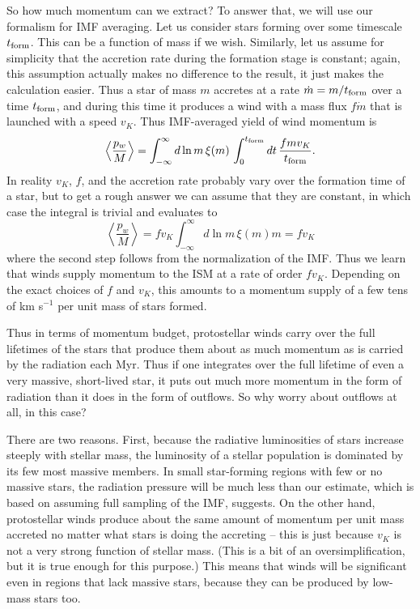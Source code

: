 So how much momentum can we extract? To answer that, we will use our formalism for IMF averaging. Let us consider stars forming over some timescale $t_{\rm form}$. This can be a function of mass if we wish. Similarly, let us assume for simplicity that the accretion rate during the formation stage is constant; again, this assumption actually makes no difference to the result, it just makes the calculation easier. Thus a star of mass $m$ accretes at a rate $\dot{m} = m/t_{\rm form}$ over a time $t_{\rm form}$, and during this time it produces a wind with a mass flux $f \dot{m}$ that is launched with a speed $v_K$. Thus IMF-averaged yield of wind momentum is
\begin{equation}
\left\langle\frac{p_w}{M}\right\rangle = \int_{-\infty}^{\infty} d\ln m \, \xi(m) \, \int_0^{t_{\rm form}} dt \, \frac{f m v_K}{t_{\rm form}}.
\end{equation}
In reality $v_K$, $f$, and the accretion rate probably vary over the formation time of a star, but to get a rough answer we can assume that they are constant, in which case the integral is trivial and evaluates to
\begin{equation}
\left\langle\frac{p_w}{M}\right\rangle =  f v_K \int_{-\infty}^{\infty} d\ln m \, \xi(m) m = f v_K
\end{equation}
where the second step follows from the normalization of the IMF. Thus we learn that winds supply momentum to the ISM at a rate of order $f v_K$. Depending on the exact choices of $f$ and $v_K$, this amounts to a momentum supply of a few tens of km s$^{-1}$ per unit mass of stars formed.

Thus in terms of momentum budget, protostellar winds carry over the full lifetimes of the stars that produce them about as much momentum as is carried by the radiation each Myr. Thus if one integrates over the full lifetime of even a very massive, short-lived star, it puts out much more momentum in the form of radiation than it does in the form of outflows. So why worry about outflows at all, in this case?

There are two reasons. First, because the radiative luminosities of stars increase steeply with stellar mass, the luminosity of a stellar population is dominated by its few most massive members. In small star-forming regions with few or no massive stars, the radiation pressure will be much less than our estimate, which is based on assuming full sampling of the IMF, suggests. On the other hand, protostellar winds produce about the same amount of momentum per unit mass accreted no matter what stars is doing the accreting -- this is just because $v_K$ is not a very strong function of stellar mass. (This is a bit of an oversimplification, but it is true enough for this purpose.) This means that winds will be significant even in regions that lack massive stars, because they can be produced by low-mass stars too.

